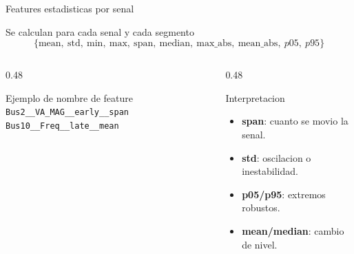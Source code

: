\documentclass[10pt,aspectratio=169]{beamer}
\newcommand{\code}[1]{\texttt{\footnotesize #1}}
\begin{document}
\begin{frame}{Features estadisticas por senal}
\small
\begin{block}{Se calculan para cada senal y cada segmento}
\[
\{\mathrm{mean},\ \mathrm{std},\ \mathrm{min},\ \mathrm{max},\ \mathrm{span},\ 
\mathrm{median},\ \mathrm{max\_abs},\ \mathrm{mean\_abs},\ p05,\ p95\}
\]
\end{block}
\begin{columns}[T,totalwidth=\textwidth]
\begin{column}{0.48\textwidth}
\begin{exampleblock}{Ejemplo de nombre de feature}
\code{Bus2\_\_VA\_MAG\_\_early\_\_span}\\[1mm]
\code{Bus10\_\_Freq\_\_late\_\_mean}
\end{exampleblock}
\end{column}
\begin{column}{0.48\textwidth}
\begin{block}{Interpretacion}
\begin{itemize}
  \item \textbf{span}: cuanto se movio la senal.
  \item \textbf{std}: oscilacion o inestabilidad.
  \item \textbf{p05/p95}: extremos robustos.
  \item \textbf{mean/median}: cambio de nivel.
\end{itemize}
\end{block}
\end{column}
\end{columns}
\end{frame}
\end{document}
